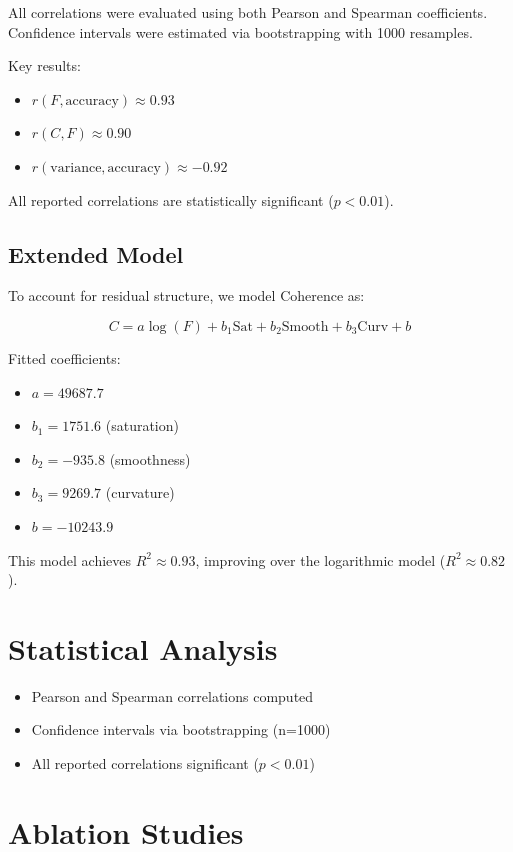 \documentclass[11pt]{article}
\begin{document}
All correlations were evaluated using both Pearson and Spearman coefficients.
Confidence intervals were estimated via bootstrapping with 1000 resamples.

Key results:
\begin{itemize}
	\item $r(F, \text{accuracy}) \approx 0.93$
	\item $r(C, F) \approx 0.90$
	\item $r(\text{variance}, \text{accuracy}) \approx -0.92$
\end{itemize}

All reported correlations are statistically significant ($p < 0.01$).

\subsection{Extended Model}

To account for residual structure, we model Coherence as:

\[
	C = a \log(F) + b_1 \mathrm{Sat} + b_2 \mathrm{Smooth} + b_3 \mathrm{Curv} + b
\]

Fitted coefficients:
\begin{itemize}
	\item $a = 49687.7$
	\item $b_1 = 1751.6$ (saturation)
	\item $b_2 = -935.8$ (smoothness)
	\item $b_3 = 9269.7$ (curvature)
	\item $b = -10243.9$
\end{itemize}

This model achieves $R^2 \approx 0.93$, improving over the logarithmic model ($R^2 \approx 0.82$).

\section{Statistical Analysis}

\begin{itemize}
	\item Pearson and Spearman correlations computed
	\item Confidence intervals via bootstrapping (n=1000)
	\item All reported correlations significant ($p<0.01$)
\end{itemize}

\section{Ablation Studies}
\end{document}
